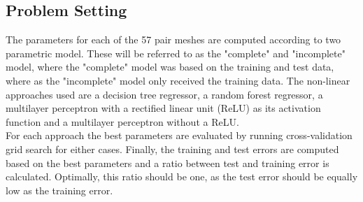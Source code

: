 \subsection{Problem Setting}
The parameters for each of the 57 pair meshes are computed according to two parametric model. These will be referred to as the "complete" and "incomplete" model, where the "complete" model was based on the training and test data, where as the "incomplete" model only received the training data. The non-linear approaches used are a decision tree regressor, a random forest regressor, a multilayer perceptron with a rectified linear unit (ReLU) as its activation function and a multilayer perceptron without a ReLU. \\
For each approach the best parameters are evaluated by running cross-validation grid search for either cases. Finally, the training and test errors are computed based on the best parameters and a ratio between test and training error is calculated. Optimally, this ratio should be one, as the test error should be equally low as the training error.

